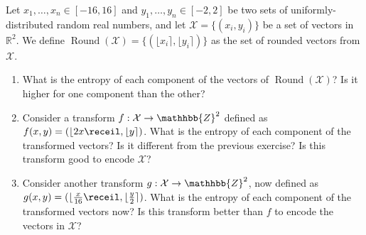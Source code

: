 \begin{exercise}
Let $x_1, \ldots , x_n \in [-16,16]$ and $y_1, \ldots , y_n \in [-2,2]$ be two sets of uniformly-distributed random real numbers, and let $\mathcal{X}=\lbrace (x_i, y_i) \rbrace$ be a set of vectors in $\mathbb{R}^2$. We define $\operatorname{Round}(\mathcal{X}) = \lbrace (\lfloor x_i \rceil, \lfloor y_i \rceil ) \rbrace$ as the set of rounded vectors from $\mathcal{X}$.
\begin{enumerate}
\item What is the entropy of each component of the vectors of $\operatorname{Round}(\mathcal{X})$? Is it higher for one component than the other?
\item Consider a transform $f : \mathcal{X} \rightarrow \mathhbb{Z}^2$ defined as $f(x,y) = (\lfloor 2x \receil, \lfloor y \rceil)$. What is the entropy of each component of the transformed vectors? Is it different from the previous exercise? Is this transform good to encode $\mathcal{X}$?
\item Consider another transform $g : \mathcal{X} \rightarrow \mathhbb{Z}^2$, now defined as $g(x,y) = (\lfloor \frac{x}{16} \receil, \lfloor \frac{y}{2} \rceil)$. What is the entropy of each component of the transformed vectors now? Is this transform better than $f$ to encode the vectors in $\mathcal{X}$?
\end{enumerate}
\end{exercise}

\vspace{0.25cm}

